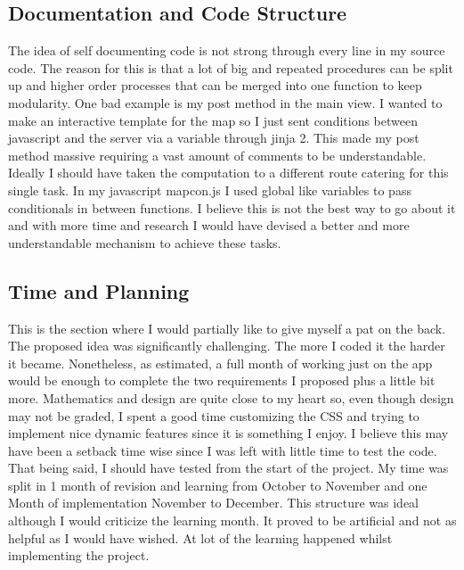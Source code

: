 \documentclass[11pt]{article}
\begin{document}
\subsection{Documentation and Code Structure}
The idea of self documenting code is not strong through every line in my source code. The reason for this is that a lot of big  and  repeated procedures can be split up and higher order processes that can be merged into one function to keep modularity. 
\newline
One bad example is my post method in the main view. I wanted to make an interactive template for the map so I just sent conditions between javascript and the server via a variable through jinja 2. This made my post method massive requiring a vast amount of comments to be understandable. Ideally I should have taken the computation to a different route catering for this single task.
\newline
In my javascript mapcon.js I used global like variables to pass conditionals in between functions. I believe this is not the best way to go about it and with more time and research I would have devised a better and more understandable mechanism to achieve these tasks.
\subsection{Time and Planning}
This is the section where I would partially like to give myself a pat on the back. The proposed idea was significantly challenging. The more I coded it the harder it became. Nonetheless, as estimated, a full month of working just on the app would be enough to complete the two requirements I proposed plus a little bit more.
\newline
Mathematics and design are quite close to my heart so, even though design may not be graded, I spent a good time customizing the CSS and trying to implement nice dynamic features since it is something I enjoy. I believe this may have been a setback time wise since I was left with little time to test the code. That being said, I should have tested from the start of the project.
\newline
My time was split in 1 month of revision and learning from October to November and one Month of implementation November to December. This structure was ideal although I would criticize the learning month. It proved to be artificial and not as helpful as I would have wished. At lot of the learning happened whilst implementing the project.
\end{document}
